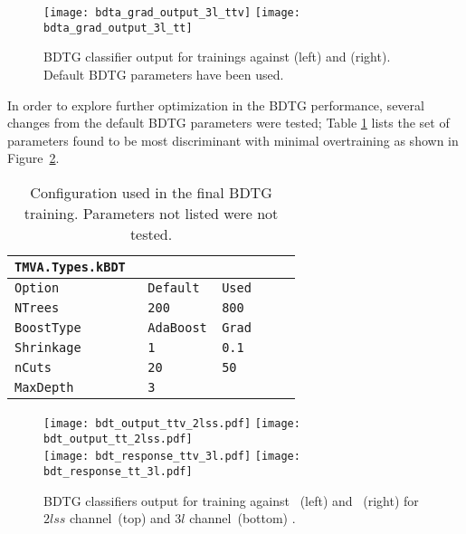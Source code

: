 \begin{figure} [!h]
  \centering
   \texttt{[image: bdta\_grad\_output\_3l\_ttv]}
   \texttt{[image: bdta\_grad\_output\_3l\_tt]}
\caption[BDTG classifier response. Default parameters.]{BDTG classifier output for trainings against \ttV (left) and \ttbar(right). Default BDTG  parameters have been used.}
\label{fig:bdtg_output_default}
\end{figure}

In order to explore further optimization in the BDTG performance, several changes from the default BDTG parameters were tested; Table \ref{tab:bdtsettings} lists the set of parameters found to be most discriminant with minimal overtraining as shown in Figure~\ref{fig:output_2lss}.  

\begin{table} [!h]
\centering
\begin{tabular}{lll}\hline
  \verb|TMVA.Types.kBDT                  | \\\hline
  \verb|Option            Default   Used |\\
  \verb|NTrees            200       800  |\\
  \verb|BoostType         AdaBoost  Grad | \\
  \verb|Shrinkage         1         0.1  | \\ 
  \verb|nCuts             20        50   | \\
  \verb|MaxDepth          3              | \\ \hline
\end{tabular}
\caption[Configuration used in the final BDTG training.]{Configuration used in the final BDTG training. Parameters not listed were not tested.}\label{tab:bdtsettings}
\end{table}

\begin{figure} [!h]
  \centering
   \texttt{[image: bdt\_output\_ttv\_2lss.pdf]}
   \texttt{[image: bdt\_output\_tt\_2lss.pdf]}\\
   \texttt{[image: bdt\_response\_ttv\_3l.pdf]}
   \texttt{[image: bdt\_response\_tt\_3l.pdf]}
\caption[BDTG classifier output.]{BDTG classifiers output for training against \ttV\ (left) and \ttbar\ (right) for $2lss$ channel\ (top) and $3l$ channel\ (bottom) .}
\label{fig:output_2lss}
\end{figure}

